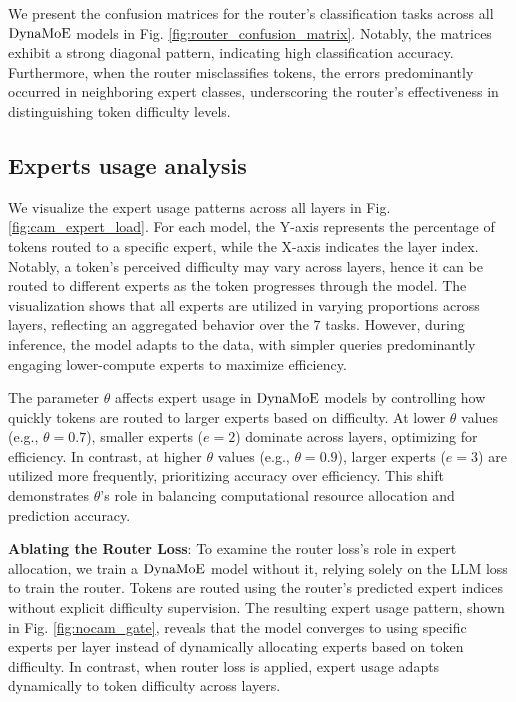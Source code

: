We present the confusion matrices for the router's classification tasks across all $\operatorname{DynaMoE}$ models in Fig. \ref{fig:router_confusion_matrix}. Notably, the matrices exhibit a strong diagonal pattern, indicating high classification accuracy. Furthermore, when the router misclassifies tokens, the errors predominantly occurred in neighboring expert classes, underscoring the router's effectiveness in distinguishing token difficulty levels.


\subsection{Experts usage analysis}
We visualize the expert usage patterns across all layers in  Fig. \ref{fig:cam_expert_load}. For each model, the Y-axis represents the percentage of tokens routed to a specific expert, while the X-axis indicates the layer index. Notably, a token's perceived difficulty may vary across layers, hence it can be routed to different experts as the token progresses through the model. The visualization shows that all experts are utilized in varying proportions across layers, reflecting an aggregated behavior over the $7$ tasks. However, during inference, the model adapts to the data, with simpler queries predominantly engaging lower-compute experts to maximize efficiency.


The parameter $\theta$ affects expert usage in $\operatorname{DynaMoE}$ models by controlling how quickly tokens are routed to larger experts based on difficulty. At lower $\theta$ values (e.g., $\theta=0.7$), smaller experts ($e=2$) dominate across layers, optimizing for efficiency. In contrast, at higher $\theta$ values (e.g., $\theta=0.9$), larger experts ($e=3$) are utilized more frequently, prioritizing accuracy over efficiency. This shift demonstrates $\theta$'s role in balancing computational resource allocation and prediction accuracy.


\textbf{Ablating the Router Loss}: 
To examine the router loss's role in expert allocation, we train a $\operatorname{DynaMoE}$ model without it, relying solely on the LLM loss to train the router. Tokens are routed using the router’s predicted expert indices without explicit difficulty supervision. The resulting expert usage pattern, shown in Fig. \ref{fig:nocam_gate}, reveals that the model converges to using specific experts per layer instead of dynamically allocating experts based on token difficulty. In contrast, when router loss is applied, expert usage adapts dynamically to token difficulty across layers.

